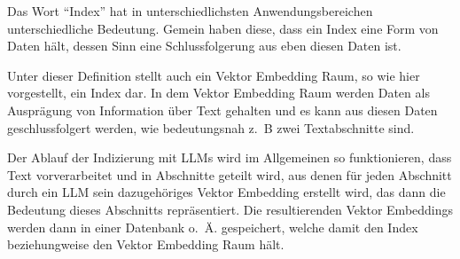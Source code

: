 \documentclass[../main.tex]{subfiles}
\begin{document}
Das Wort \enquote{Index} hat in unterschiedlichsten Anwendungsbereichen unterschiedliche Bedeutung.
Gemein haben diese, dass ein Index eine Form von Daten hält, dessen Sinn eine Schlussfolgerung aus eben diesen Daten ist.
\cite{Chatterjee2017Index,Lo2016What,Vickery1950THE}

Unter dieser Definition stellt auch ein Vektor Embedding Raum, so wie hier vorgestellt, ein Index dar.
In dem Vektor Embedding Raum werden Daten als Ausprägung von Information über Text gehalten und es kann aus diesen Daten geschlussfolgert werden, wie bedeutungsnah z. B zwei Textabschnitte sind.

Der Ablauf der Indizierung mit \glspl{LLM} wird im Allgemeinen so funktionieren, dass Text vorverarbeitet und in Abschnitte geteilt wird, aus denen für jeden Abschnitt durch ein \gls{LLM} sein  dazugehöriges Vektor Embedding erstellt wird, das dann die Bedeutung dieses Abschnitts repräsentiert.
Die resultierenden Vektor Embeddings werden dann in einer Datenbank o. Ä. gespeichert, welche damit den Index beziehungweise den Vektor Embedding Raum hält.
\cite{ji2022speeding}
\end{document}
